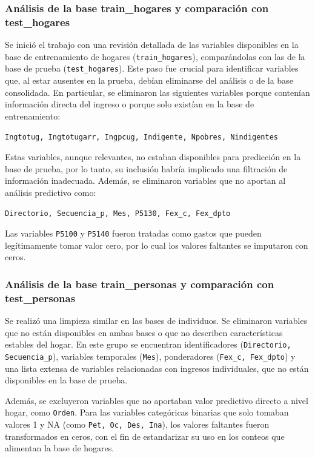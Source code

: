 \documentclass[12pt,a4paper,onecolumn]{article}
\begin{document}
\subsubsection{Análisis de la base train\_hogares y comparación con test\_hogares}

Se inició el trabajo con una revisión detallada de las variables disponibles en la base de entrenamiento de hogares (\texttt{train\_hogares}), comparándolas con las de la base de prueba (\texttt{test\_hogares}). Este paso fue crucial para identificar variables que, al estar ausentes en la prueba, debían eliminarse del análisis o de la base consolidada. En particular, se eliminaron las siguientes variables porque contenían información directa del ingreso o porque solo existían en la base de entrenamiento:

\texttt{Ingtotug, Ingtotugarr, Ingpcug, Indigente, Npobres, Nindigentes}

Estas variables, aunque relevantes, no estaban disponibles para predicción en la base de prueba, por lo tanto, su inclusión habría implicado una filtración de información inadecuada. Además, se eliminaron variables que no aportan al análisis predictivo como:

\texttt{Directorio, Secuencia\_p, Mes, P5130, Fex\_c, Fex\_dpto}

Las variables \texttt{P5100} y \texttt{P5140} fueron tratadas como gastos que pueden legítimamente tomar valor cero, por lo cual los valores faltantes se imputaron con ceros.

\subsubsection{Análisis de la base train\_personas y comparación con test\_personas}

Se realizó una limpieza similar en las bases de individuos. Se eliminaron variables que no están disponibles en ambas bases o que no describen características estables del hogar. En este grupo se encuentran identificadores (\texttt{Directorio, Secuencia\_p}), variables temporales (\texttt{Mes}), ponderadores (\texttt{Fex\_c, Fex\_dpto}) y una lista extensa de variables relacionadas con ingresos individuales, que no están disponibles en la base de prueba.

Además, se excluyeron variables que no aportaban valor predictivo directo a nivel hogar, como \texttt{Orden}. Para las variables categóricas binarias que solo tomaban valores 1 y NA (como \texttt{Pet, Oc, Des, Ina}), los valores faltantes fueron transformados en ceros, con el fin de estandarizar su uso en los conteos que alimentan la base de hogares.
\end{document}
